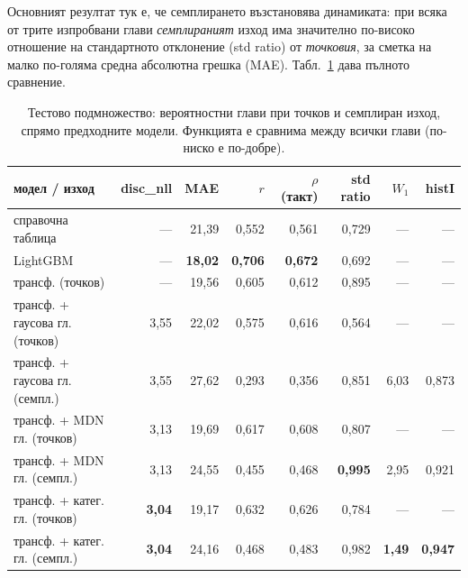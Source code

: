 Основният резултат тук е, че семплирането възстановява динамиката: при
всяка от трите изпробвани глави \emph{семплираният} изход има значително по-високо 
отношение на стандартното отклонение (std ratio) от \emph{точковия}, за сметка на 
малко по-голяма средна абсолютна грешка (MAE).
Табл.~\ref{tab:plan_c} дава пълното сравнение.

\begin{table}[H]
  \centering
  \caption{Тестово подмножество: вероятностни глави при точков и семплиран изход,
  спрямо предходните модели. Функцията  е сравнима между всички глави
  (по-ниско е по-добре).}
  \label{tab:plan_c}
  \begin{tabular}{@{}lrrrrrrr@{}}
    \toprule
    модел / изход & disc\_nll & MAE & $r$ & $\rho$ (такт) & std ratio & $W_1$ & histI \\
    \midrule
    справочна таблица       & — & 21,39 & 0,552 & 0,561 & 0,729 & — & — \\
    LightGBM       & — & \textbf{18,02} & \textbf{0,706} & \textbf{0,672} & 0,692 & — & — \\
    трансф. (точков)   & — & 19,56 & 0,605 & 0,612 & 0,895 & — & — \\
    \midrule
    трансф. + гаусова гл. (точков)         & 3,55 & 22,02 & 0,575 & 0,616 & 0,564 & — & — \\
    трансф. + гаусова гл. (семпл.)          & 3,55 & 27,62 & 0,293 & 0,356 & 0,851 & 6,03 & 0,873 \\
    трансф. + MDN гл. (точков)             & 3,13 & 19,69 & 0,617 & 0,608 & 0,807 & — & — \\
    трансф. + MDN гл. (семпл.)              & 3,13 & 24,55 & 0,455 & 0,468 & \textbf{0,995} & 2,95 & 0,921 \\
    трансф. + катег. гл. (точков) & \textbf{3,04} & 19,17 & 0,632 & 0,626 & 0,784 & — & — \\
    трансф. + катег. гл. (семпл.)  & \textbf{3,04} & 24,16 & 0,468 & 0,483 & 0,982 & \textbf{1,49} & \textbf{0,947} \\
    \bottomrule
  \end{tabular}
\end{table}

